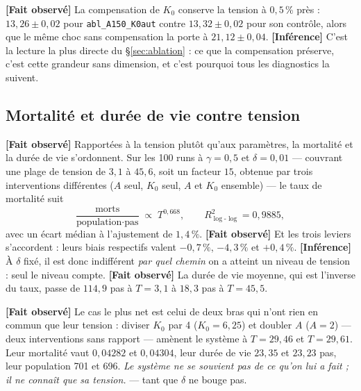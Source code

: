 \documentclass[11pt,a4paper]{article}
\newcommand{\code}[1]{\texttt{#1}}
\newcommand{\fait}{\textbf{[Fait observé]}}
\newcommand{\inference}{\textbf{[Inférence]}}
\begin{document}
\fait{} La compensation de $K_0$ conserve la tension à $0{,}5$\,\% près :
$13{,}26 \pm 0{,}02$ pour \code{abl\_A150\_K0aut} contre
$13{,}32 \pm 0{,}02$ pour son contrôle, alors que le même choc sans
compensation la porte à $21{,}12 \pm 0{,}04$. \inference{} C'est la lecture
la plus directe du §\ref{sec:ablation} : ce que la compensation préserve,
c'est cette grandeur sans dimension, et c'est pourquoi tous les diagnostics
la suivent.

\subsection{Mortalité et durée de vie contre tension}

\fait{} Rapportées à la tension plutôt qu'aux paramètres, la mortalité et la
durée de vie s'ordonnent. Sur les 100 runs à $\gamma = 0{,}5$ et
$\delta = 0{,}01$ --- couvrant une plage de tension de $3{,}1$ à $45{,}6$,
soit un facteur $15$, obtenue par trois interventions différentes ($A$ seul,
$K_0$ seul, $A$ et $K_0$ ensemble) --- le taux de mortalité suit
\begin{equation}
\frac{\text{morts}}{\text{population}\cdot\text{pas}} \;\propto\; T^{0{,}668},
\qquad R^2_{\log\text{-}\log} = 0{,}9885 ,
\label{eq:mortalite}
\end{equation}
avec un écart médian à l'ajustement de $1{,}4\,\%$. \fait{} Et les trois
leviers s'accordent : leurs biais respectifs valent $-0{,}7\,\%$,
$-4{,}3\,\%$ et $+0{,}4\,\%$. \inference{} À $\delta$ fixé, il est donc
indifférent \emph{par quel chemin} on a atteint un niveau de tension : seul
le niveau compte. \fait{} La durée de vie moyenne, qui est l'inverse du
taux, passe de $114{,}9$ pas à $T = 3{,}1$ à $18{,}3$ pas à $T = 45{,}5$.

\fait{} Le cas le plus net est celui de deux bras qui n'ont rien en commun
que leur tension : diviser $K_0$ par 4 ($K_0 = 6{,}25$) et doubler $A$
($A = 2$) --- deux interventions sans rapport --- amènent le système à
$T = 29{,}46$ et $T = 29{,}61$. Leur mortalité vaut $0{,}04282$ et
$0{,}04304$, leur durée de vie $23{,}35$ et $23{,}23$ pas, leur population
701 et 696. \emph{Le système ne se souvient pas de ce qu'on lui a fait ;
il ne connaît que sa tension.} --- tant que $\delta$ ne bouge pas.
\end{document}
